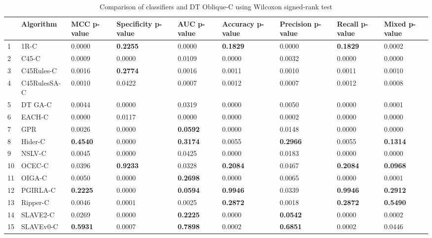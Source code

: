 \begin{table}
\footnotesize
\caption{Comparison of classifiers and DT Oblique-C using Wilcoxon signed-rank test}
\label{tab:wilcoxon comparison}
\begin{tabular}{lllllllll}
\hline
 & Algorithm & MCC p-value & Specificity p-value & AUC p-value & Accuracy p-value & Precision p-value & Recall p-value & Mixed p-value \\
\hline
1 & 1R-C & 0.0000 & \textbf{0.2255} & 0.0000 & \textbf{0.1829} & 0.0000 & \textbf{0.1829} & 0.0002 \\
2 & C45-C & 0.0009 & 0.0000 & 0.0109 & 0.0000 & 0.0032 & 0.0000 & 0.0000 \\
3 & C45Rules-C & 0.0016 & \textbf{0.2774} & 0.0016 & 0.0011 & 0.0010 & 0.0011 & 0.0010 \\
4 & C45RulesSA-C & 0.0010 & 0.0422 & 0.0007 & 0.0012 & 0.0007 & 0.0012 & 0.0008 \\
5 & DT GA-C & 0.0044 & 0.0000 & 0.0319 & 0.0000 & 0.0050 & 0.0000 & 0.0001 \\
6 & EACH-C & 0.0000 & 0.0117 & 0.0000 & 0.0000 & 0.0002 & 0.0000 & 0.0000 \\
7 & GPR & 0.0026 & 0.0000 & \textbf{0.0592} & 0.0000 & 0.0148 & 0.0000 & 0.0000 \\
8 & Hider-C & \textbf{0.4540} & 0.0000 & \textbf{0.3174} & 0.0055 & \textbf{0.2966} & 0.0055 & \textbf{0.1314} \\
9 & NSLV-C & 0.0045 & 0.0000 & 0.0425 & 0.0000 & 0.0183 & 0.0000 & 0.0000 \\
10 & OCEC-C & 0.0396 & \textbf{0.9233} & 0.0328 & \textbf{0.2084} & 0.0467 & \textbf{0.2084} & \textbf{0.0968} \\
11 & OIGA-C & 0.0050 & 0.0000 & \textbf{0.2698} & 0.0000 & 0.0065 & 0.0000 & 0.0001 \\
12 & PGIRLA-C & \textbf{0.2225} & 0.0000 & \textbf{0.0594} & \textbf{0.9946} & 0.0339 & \textbf{0.9946} & \textbf{0.2912} \\
13 & Ripper-C & 0.0046 & 0.0001 & 0.0025 & \textbf{0.2872} & 0.0018 & \textbf{0.2872} & \textbf{0.5490} \\
14 & SLAVE2-C & 0.0269 & 0.0000 & \textbf{0.2225} & 0.0000 & \textbf{0.0542} & 0.0000 & 0.0002 \\
15 & SLAVEv0-C & \textbf{0.5931} & 0.0007 & \textbf{0.7898} & 0.0002 & \textbf{0.6851} & 0.0002 & 0.0446 \\
\hline
\end{tabular}
\end{table}
